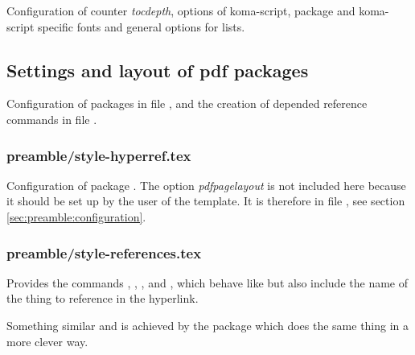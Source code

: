 Configuration of counter \emph{tocdepth}, options of koma-script, package  and koma-script specific fonts and general options for lists.


\subsection{Settings and layout of pdf packages}
\label{sec:style:pdf}

Configuration of packages  in file ,  and the creation of  depended reference commands in file .


\subsubsection{preamble/style-hyperref.tex}

Configuration of package . The option \emph{pdfpagelayout} is not included here because it should be set up by the user of the template. It is therefore in file , see section \vref{sec:preamble:configuration}.


\subsubsection{preamble/style-references.tex}

Provides the commands , , ,  and , which behave like  but also include the name of the thing to reference in the hyperlink.

Something similar and is achieved by the package  which does the same thing in a more clever way.


